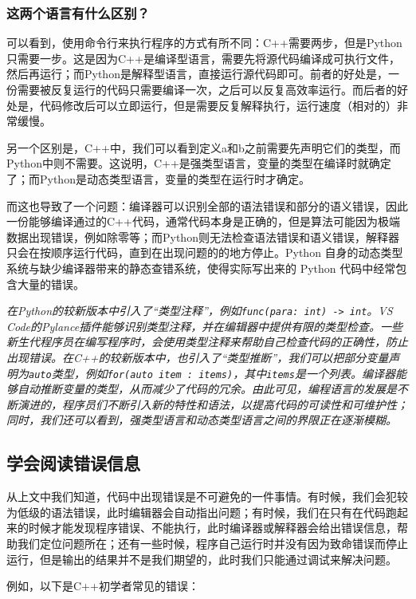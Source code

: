 \documentclass[../main.tex]{subfiles}
\begin{document}
\subsubsection{这两个语言有什么区别？}

可以看到，使用命令行来执行程序的方式有所不同：C++需要两步，但是Python只需要一步。这是因为C++是编译型语言，需要先将源代码编译成可执行文件，然后再运行；而Python是解释型语言，直接运行源代码即可。前者的好处是，一份需要被反复运行的代码只需要编译一次，之后可以反复高效率运行。而后者的好处是，代码修改后可以立即运行，但是需要反复解释执行，运行速度（相对的）非常缓慢。

另一个区别是，C++中，我们可以看到定义a和b之前需要先声明它们的类型，而Python中则不需要。这说明，C++是强类型语言，变量的类型在编译时就确定了；而Python是动态类型语言，变量的类型在运行时才确定。

而这也导致了一个问题：编译器可以识别全部的语法错误和部分的语义错误，因此一份能够编译通过的C++代码，通常代码本身是正确的，但是算法可能因为极端数据出现错误，例如除零等；而Python则无法检查语法错误和语义错误，解释器只会在按顺序运行代码，直到在出现问题的的地方停止。Python 自身的动态类型系统与缺少编译器带来的静态查错系统，使得实际写出来的 Python 代码中经常包含大量的错误。

\emph{在Python的较新版本中引入了“类型注释”，例如\texttt{func(para: int) -> int}。VS Code的Pylance插件能够识别类型注释，并在编辑器中提供有限的类型检查。一些新生代程序员在编写程序时，会使用类型注释来帮助自己检查代码的正确性，防止出现错误。在C++的较新版本中，也引入了“类型推断”，我们可以把部分变量声明为\texttt{auto}类型，例如\texttt{for(auto item : items)}，其中\texttt{items}是一个列表。编译器能够自动推断变量的类型，从而减少了代码的冗余。由此可见，编程语言的发展是不断演进的，程序员们不断引入新的特性和语法，以提高代码的可读性和可维护性；同时，我们还可以看到，强类型语言和动态类型语言之间的界限正在逐渐模糊。}

\subsection{学会阅读错误信息}

从上文中我们知道，代码中出现错误是不可避免的一件事情。有时候，我们会犯较为低级的语法错误，此时编辑器会自动指出问题；有时候，我们在只有在代码跑起来的时候才能发现程序错误、不能执行，此时编译器或解释器会给出错误信息，帮助我们定位问题所在；还有一些时候，程序自己运行时并没有因为致命错误而停止运行，但是输出的结果并不是我们期望的，此时我们只能通过调试来解决问题。

例如，以下是C++初学者常见的错误：
\end{document}
